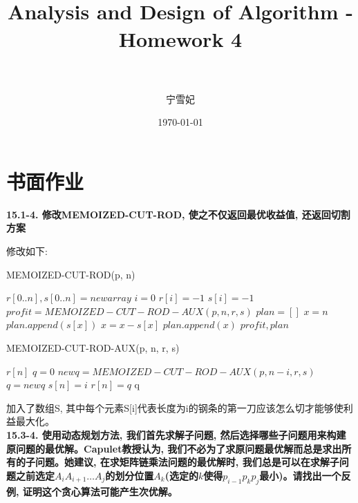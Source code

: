 \documentclass[paper=a4, fontsize=11pt]{scrartcl} %
\title{	
\normalfont \normalsize 
\horrule{0.5pt} \\[0.4cm] %
\huge Analysis and Design of Algorithm - Homework 4\\ %
\horrule{2pt} \\[0.5cm] %
}
\author{宁雪妃} %
\date{\normalsize\today} %
\numberwithin{equation}{section} %
\numberwithin{figure}{section} %
\numberwithin{table}{section} %
\begin{document}
\maketitle %


\section{书面作业}

\textbf{15.1-4. 修改MEMOIZED-CUT-ROD, 使之不仅返回最优收益值, 还返回切割方案}

修改如下:
\begin{algorithm}[ht]
  \caption{MEMOIZED-CUT-ROD(p, n)}
  \begin{algorithmic}[1]
  \State $r[0..n], s[0..n] = new array$
  \State $i = 0$
  \State $ r[i] = -1$
  \State $ s[i] = -1$
  \EndFor
  \State $profit = MEMOIZED-CUT-ROD-AUX(p, n, r, s)$
  \State $plan = []$
  \State $x = n$
  \State $plan.append(s[x])$
  \State $x = x - s[x]$
  \EndWhile
  \State $plan.append(x)$
  \State\Return $profit, plan$
  \end{algorithmic}
\end{algorithm}

\begin{algorithm}[ht]
  \caption{MEMOIZED-CUT-ROD-AUX(p, n, r, s)}
  \begin{algorithmic}[1]
    \Return $r[n]$
    \EndIf
    \State $q = 0$
    \Else
    \State $newq = MEMOIZED-CUT-ROD-AUX(p, n-i, r, s)$
    \State $q = newq$
    \State $s[n] = i$
    \EndIf
    \EndFor
    \EndIf
    \State $r[n] = q$
    \State\Return q
  \end{algorithmic}
\end{algorithm}
加入了数组S, 其中每个元素S[i]代表长度为i的钢条的第一刀应该怎么切才能够使利益最大化。
\\[4ex]

\textbf{15.3-4. 使用动态规划方法, 我们首先求解子问题, 然后选择哪些子问题用来构建原问题的最优解。Capulet教授认为, 我们不必为了求原问题最优解而总是求出所有的子问题。她建议, 在求矩阵链乘法问题的最优解时, 我们总是可以在求解子问题之前选定$A_iA_{i+1} \dots A_j$的划分位置$A_k$(选定的$k$使得$p_{i-1}p_kp_j$最小)。请找出一个反例, 证明这个贪心算法可能产生次优解。}
\end{document}
